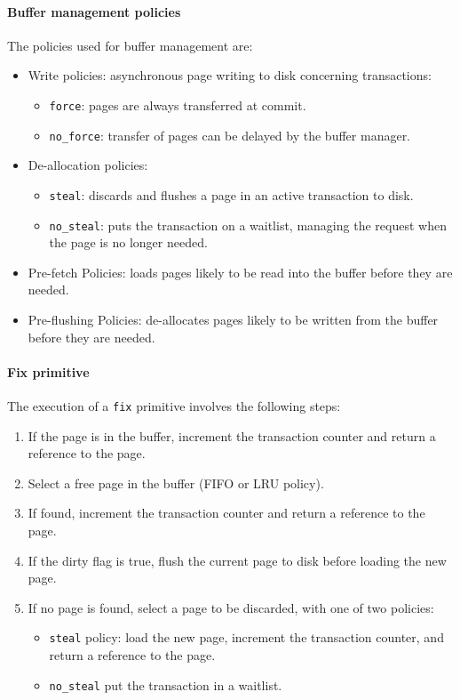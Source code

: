 \paragraph*{Buffer management policies}
The policies used for buffer management are: 
\begin{itemize}
    \item Write policies: asynchronous page writing to disk concerning transactions:
        \begin{itemize}
            \item \texttt{force}: pages are always transferred at commit.
            \item \texttt{no\_force}: transfer of pages can be delayed by the buffer manager.
        \end{itemize}
    \item De-allocation policies:
        \begin{itemize}
            \item \texttt{steal}: discards and flushes a page in an active transaction to disk.
            \item \texttt{no\_steal}: puts the transaction on a waitlist, managing the request when the page is no longer needed.
        \end{itemize}
    \item Pre-fetch Policies: loads pages likely to be read into the buffer before they are needed.
    \item Pre-flushing Policies: de-allocates pages likely to be written from the buffer before they are needed.
\end{itemize}

\paragraph*{Fix primitive}
The execution of a \texttt{fix} primitive involves the following steps:
\begin{enumerate}
    \item If the page is in the buffer, increment the transaction counter and return a reference to the page.
    \item Select a free page in the buffer (FIFO or LRU policy).
    \item If found, increment the transaction counter and return a reference to the page.
    \item If the dirty flag is true, flush the current page to disk before loading the new page.
    \item If no page is found, select a page to be discarded, with one of two policies:
        \begin{itemize}
            \item \texttt{steal} policy: load the new page, increment the transaction counter, and return a reference to the page.
            \item \texttt{no\_steal} put the transaction in a waitlist.
        \end{itemize}
\end{enumerate}